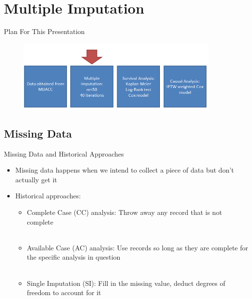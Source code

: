 \section{Multiple Imputation}
\begin{frame}{Plan For This Presentation}
  \begin{figure}[h!]
  \centering
    \includegraphics[width=0.9\textwidth]{mi_flow}
\label{fig:mi_flow}
\end{figure} 
\end{frame}

\subsection{Missing Data}
\begin{frame}{Missing Data and Historical Approaches}
 \begin{itemize}
 \item Missing data happens when we intend to collect a piece of data but don't actually get it
 \item Historical approaches:
 \begin{itemize}
  \item Complete Case (CC) analysis: Throw away any record that is not complete\\~\\
 \item Available Case (AC) analysis: Use records so long as they are 
 complete for the specific analysis in question\\~\\
 \item Single Imputation (SI): Fill in the missing value, deduct degrees of freedom to account for it
 \end{itemize}
 \end{itemize}
 
\end{frame}

